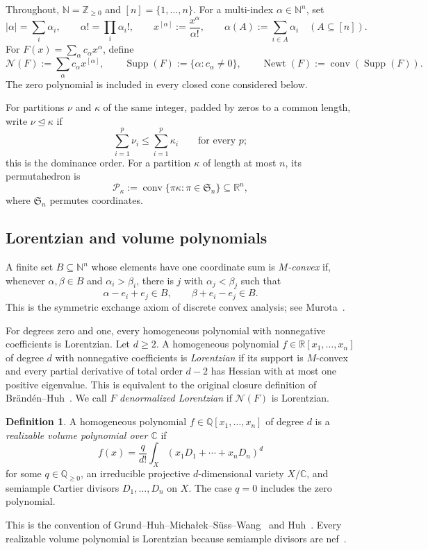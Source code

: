\documentclass[11pt,a4paper,oneside]{amsart}
\numberwithin{equation}{section}
\theoremstyle{definition}
\newtheorem{definition}[theorem]{Definition}
\theoremstyle{remark}
\DeclareMathOperator{\Supp}{Supp}
\DeclareMathOperator{\Newt}{Newt}
\DeclareMathOperator{\conv}{conv}
\newcommand{\N}{\mathbb N}
\newcommand{\Z}{\mathbb Z}
\newcommand{\Q}{\mathbb Q}
\newcommand{\R}{\mathbb R}
\newcommand{\C}{\mathbb C}
\newcommand{\cN}{\mathcal N}
\begin{document}
Throughout, $\N=\Z_{\geq0}$ and $[n]=\{1,\ldots,n\}$.  For a multi-index $\alpha\in\N^n$, set
\[
 |\alpha|=\sum_i\alpha_i,
 \qquad
 \alpha!=\prod_i\alpha_i!,
 \qquad
 x^{[\alpha]}:=\frac{x^\alpha}{\alpha!},
 \qquad
 \alpha(A):=\sum_{i\in A}\alpha_i\quad(A\subseteq[n]).
\]
For $F(x)=\sum_\alpha c_\alpha x^\alpha$, define
\begin{equation}\label{eq:normalization}
 \cN(F):=\sum_\alpha c_\alpha x^{[\alpha]},
 \qquad
 \Supp(F):=\{\alpha:c_\alpha\neq0\},
 \qquad
 \Newt(F):=\conv(\Supp(F)).
\end{equation}
The zero polynomial is included in every closed cone considered below.

For partitions $\nu$ and $\kappa$ of the same integer, padded by zeros to a common length, write $\nu\unlhd\kappa$ if
\[
 \sum_{i=1}^p\nu_i\leq\sum_{i=1}^p\kappa_i
 \qquad\text{for every }p;
\]
this is the dominance order.  For a partition $\kappa$ of length at most $n$, its permutahedron is
\[
 \mathcal P_\kappa:=\conv\{\pi\kappa:\pi\in\mathfrak S_n\}
 \subseteq\R^n,
\]
where $\mathfrak S_n$ permutes coordinates.

\subsection{Lorentzian and volume polynomials}

A finite set $B\subseteq\N^n$ whose elements have one coordinate sum is \emph{$M$-convex} if, whenever $\alpha,\beta\in B$ and $\alpha_i>\beta_i$, there is $j$ with $\alpha_j<\beta_j$ such that
\[
 \alpha-e_i+e_j\in B,
 \qquad
 \beta+e_i-e_j\in B.
\]
This is the symmetric exchange axiom of discrete convex analysis; see Murota~\cite[Chapter~4]{Murota03}.

For degrees zero and one, every homogeneous polynomial with nonnegative coefficients is Lorentzian.  Let $d\geq2$.  A homogeneous polynomial $f\in\R[x_1,\ldots,x_n]$ of degree $d$ with nonnegative coefficients is \emph{Lorentzian} if its support is $M$-convex and every partial derivative of total order $d-2$ has Hessian with at most one positive eigenvalue.  This is equivalent to the original closure definition of Br\"and\'en--Huh~\cite[Theorem~2.25]{BH20}.  We call $F$ \emph{denormalized Lorentzian} if $\cN(F)$ is Lorentzian.

\begin{definition}\label{def:rv}
A homogeneous polynomial $f\in\Q[x_1,\ldots,x_n]$ of degree $d$ is a \emph{realizable volume polynomial over $\C$} if
\begin{equation}\label{eq:rv-definition}
 f(x)=\frac{q}{d!}\int_X(x_1D_1+\cdots+x_nD_n)^d
\end{equation}
for some $q\in\Q_{\geq0}$, an irreducible projective $d$-dimensional variety $X/\C$, and semiample Cartier divisors $D_1,\ldots,D_n$ on $X$.  The case $q=0$ includes the zero polynomial.
\end{definition}
This is the convention of Grund--Huh--Micha\l ek--S\"uss--Wang~\cite[Definition~1.1]{GHMSW25} and Huh~\cite[Definition~3.1]{HuhVolume26}.  Every realizable volume polynomial is Lorentzian because semiample divisors are nef~\cite[Theorem~4.6]{BH20}.
\end{document}

